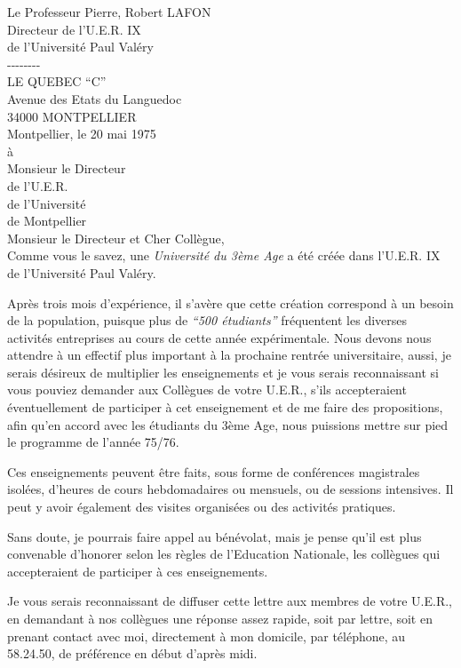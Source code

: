 
Le Professeur Pierre, Robert LAFON\\
Directeur de l'U.E.R. IX\\
de l'Université Paul Valéry\\
-{}-{}-{}-{}-{}-{}-{}-\\
LE QUEBEC ``C''\\
Avenue des Etats du Languedoc\\
34000 MONTPELLIER\\

Montpellier, le 20 mai 1975\\

à\\
Monsieur le Directeur\\
de l'U.E.R.\\
de l'Université\\
de Montpellier\\

Monsieur le Directeur et Cher Collègue,\\

Comme vous le savez, une \textit{Université du 3ème Age} a été créée dans l'U.E.R. IX de l'Université Paul Valéry.

Après trois mois d'expérience, il s'avère que cette création correspond à un besoin de la population, puisque plus de \textit{``500 étudiants''} fréquentent les diverses activités entreprises au cours de cette année expérimentale. Nous devons nous attendre à un effectif plus important à la prochaine rentrée universitaire, aussi, je serais désireux de multiplier les enseignements et je vous serais reconnaissant si vous pouviez demander aux Collègues de votre U.E.R., s'ils accepteraient éventuellement de participer à cet enseignement et de me faire des propositions, afin qu'en accord avec les étudiants du 3ème Age, nous puissions mettre sur pied le programme de l'année 75/76.

Ces enseignements peuvent être faits, sous forme de conférences magistrales isolées, d'heures de cours hebdomadaires ou mensuels, ou de sessions intensives. Il peut y avoir également des visites organisées ou des activités pratiques.

Sans doute, je pourrais faire appel au bénévolat, mais je pense qu'il est plus convenable d'honorer selon les règles de l'Education Nationale, les collègues qui accepteraient de participer à ces enseignements.

Je vous serais reconnaissant de diffuser cette lettre aux membres de votre U.E.R., en demandant à nos collègues une réponse assez rapide, soit par lettre, soit en prenant contact avec moi, directement à mon domicile, par téléphone, au 58.24.50, de préférence en début d'après midi.

